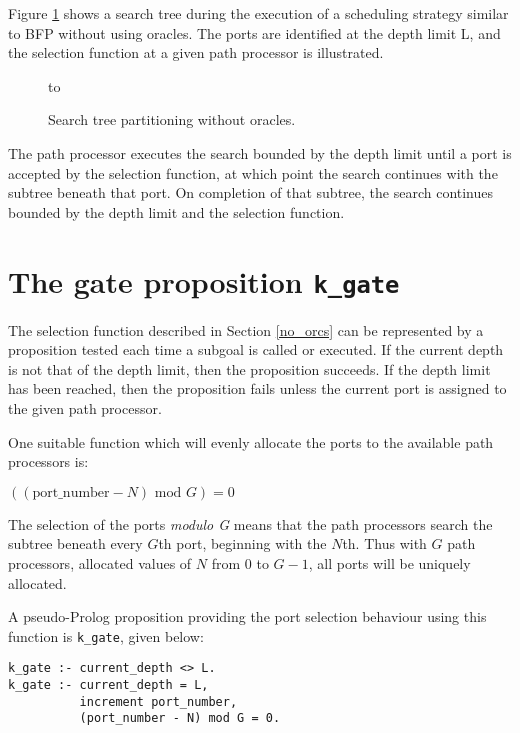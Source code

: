 Figure \ref{port_tree} shows a search tree during the execution of
a scheduling strategy similar to BFP without using oracles.  The ports
are identified at the depth limit L,  and the selection function at a
given path processor is illustrated.

\begin{figure}[htbp]
\vspace{5mm} \hbox to 
\caption{Search tree partitioning without oracles.}
\vspace{5mm}
\label{port_tree}
\end{figure}

The path processor executes the search bounded by the depth limit until
a port is accepted by the selection function, at which point the search
continues with the subtree beneath that port.  On completion of that
subtree,  the search continues bounded by the depth limit and the
selection function.

\section{The gate proposition \texttt{k\_{}gate}} %

The selection function described in Section \ref{no_orcs} 
can be represented by a proposition tested each time
a subgoal is called or executed.  If the current depth is not that of the
depth limit, then the proposition succeeds.  If the depth limit has been
reached, then the proposition fails unless the current port is assigned
to the given path processor.

One suitable function which will evenly allocate the ports to the
available path processors is:
\centerline{$((\mbox{port\_{}number}-N) \mbox{ mod } G) = 0$}

The selection of the ports \textit{modulo G} means that the path
processors search the subtree beneath every $G$th port, beginning
with the $N$th.  Thus with $G$ path processors, allocated values of
$N$ from 0 to $G-1$, all ports will be uniquely allocated.

A pseudo-Prolog proposition providing the port
selection behaviour using this function is \texttt{k\_{}gate}, given
below:
\begin{verbatim}
k_gate :- current_depth <> L.
k_gate :- current_depth = L, 
          increment port_number, 
          (port_number - N) mod G = 0.
\end{verbatim}

